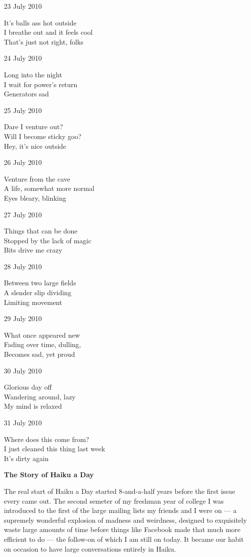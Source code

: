 \documentclass[12pt]{article}
\begin{document}
23 July 2010

It's balls ass hot outside \\
I breathe out and it feels cool \\
That's just not right, folks

24 July 2010

Long into the night \\
I wait for power's return \\
Generators sad

\newpage

25 July 2010

Dare I venture out? \\
Will I become sticky goo? \\
Hey, it's nice outside

26 July 2010

Venture from the cave \\
A life, somewhat more normal \\
Eyes bleary, blinking

27 July 2010

Things that can be done \\
Stopped by the lack of magic \\
Bits drive me crazy

28 July 2010

Between two large fields \\
A slender slip dividing \\
Limiting movement

29 July 2010

What once appeared new \\
Fading over time, dulling, \\
Becomes sad, yet proud

30 July 2010

Glorious day off \\
Wandering around, lazy \\
My mind is relaxed

31 July 2010

Where does this come from? \\
I just cleaned this thing last week \\
It's dirty again

\newpage

\begin{center}
\bf{The Story of Haiku a Day}
\end{center}

The real start of Haiku a Day started 8-and-a-half years
before the first issue every came out. The second semeter
of my freshman year of college I was introduced to the
first of the large mailing lists my friends and I were on ---
a supremely wonderful explosion of madness and weirdness,
designed to exquisitely waste large amounts of time before
things like Facebook made that much more efficient to do  ---
the follow-on of which I am still on today. It became our
habit on occasion to have large conversations entirely in
Haiku.
\end{document}
